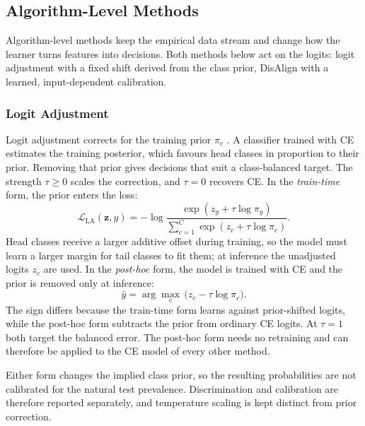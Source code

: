 \documentclass[11pt]{article}
\begin{document}
\subsection{Algorithm-Level Methods}
Algorithm-level methods keep the empirical data stream and change how the learner turns features into decisions. Both methods below act on the logits: logit adjustment with a fixed shift derived from the class prior, DisAlign with a learned, input-dependent calibration.

\subsubsection{Logit Adjustment}
Logit adjustment corrects for the training prior $\pi_c$ \citep{menon2021longTail}. A classifier trained with CE estimates the training posterior, which favours head classes in proportion to their prior. Removing that prior gives decisions that suit a class-balanced target. The strength $\tau\geq0$ scales the correction, and $\tau=0$ recovers CE. In the \emph{train-time} form, the prior enters the loss:
\begin{equation}
  \mathcal L_{\mathrm{LA}}(\mathbf z,y)=-\log\frac{\exp(z_y+\tau\log\pi_y)}{\sum_{c=1}^{C}\exp(z_c+\tau\log\pi_c)}.
  \label{eq:la-train}
\end{equation}
\noindent Head classes receive a larger additive offset during training, so the model must learn a larger margin for tail classes to fit them; at inference the unadjusted logits $z_c$ are used. In the \emph{post-hoc} form, the model is trained with CE and the prior is removed only at inference:
\begin{equation}
  \hat y=\arg\max_{c}\,\bigl(z_c-\tau\log\pi_c\bigr).
  \label{eq:la-posthoc}
\end{equation}
\noindent The sign differs because the train-time form learns against prior-shifted logits, while the post-hoc form subtracts the prior from ordinary CE logits. At $\tau=1$ both target the balanced error. The post-hoc form needs no retraining and can therefore be applied to the CE model of every other method.

Either form changes the implied class prior, so the resulting probabilities are not calibrated for the natural test prevalence. Discrimination and calibration are therefore reported separately, and temperature scaling is kept distinct from prior correction.
\end{document}
